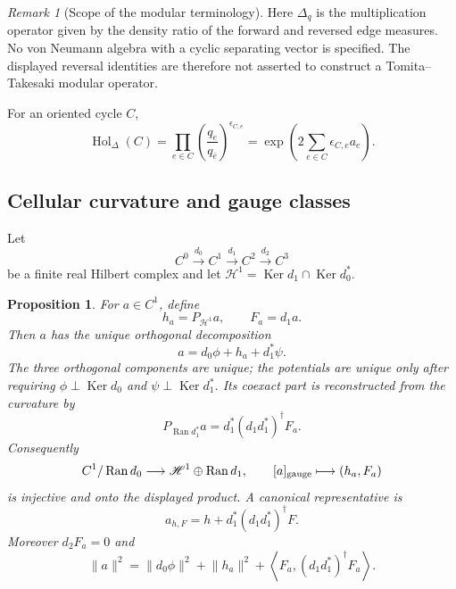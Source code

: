 \documentclass[11pt]{article}
\newtheorem{proposition}[proposition]{Proposition}
\theoremstyle{definition}
\theoremstyle{remark}
\newtheorem{remark}[remark]{Remark}
\theoremstyle{definition}
\theoremstyle{remark}
\newcommand{\Ker}{\operatorname{Ker}}
\newcommand{\Ran}{\operatorname{Ran}}
\newcommand{\norm}[1]{\lVert#1\rVert}
\newcommand{\ip}[2]{\left\langle #1,#2\right\rangle}
\begin{document}
\begin{remark}[Scope of the modular terminology]
Here $\Delta_q$ is the multiplication operator given by the density ratio
of the forward and reversed edge measures.  No von Neumann algebra with a
cyclic separating vector is specified.  The displayed reversal identities
are therefore not asserted to construct a Tomita--Takesaki modular operator.
\end{remark}

For an oriented cycle $C$,
\begin{equation}
 \operatorname{Hol}_{\Delta}(C)
 =\prod_{e\in C}\left(\frac{q_e}{q_{\bar e}}\right)^{\epsilon_{C,e}}
 =\exp\left(2\sum_{e\in C}\epsilon_{C,e}a_e\right).
 \label{eq:supp-modular-cycle-holonomy}
\end{equation}

\subsection{Cellular curvature and gauge classes}

Let
\begin{equation}
 C^0\xrightarrow{d_0}C^1\xrightarrow{d_1}C^2
 \xrightarrow{d_2}C^3
 \label{eq:supp-cellular-Hodge-complex}
\end{equation}
be a finite real Hilbert complex and let
$\mathscr H^1=\Ker d_1\cap\Ker d_0^*$.

\begin{proposition}
\label{thm:supp-modular-Hodge}
For $a\in C^1$, define
\begin{equation}
 h_a=P_{\mathscr H^1}a,
 \qquad
 F_a=d_1a.
 \label{eq:supp-modular-hF}
\end{equation}
Then $a$ has the unique orthogonal decomposition
\begin{equation}
 {a=d_0\phi+h_a+d_1^*\psi.}
 \label{eq:supp-modular-Hodge}
\end{equation}
The three orthogonal components are unique; the potentials are unique only after
requiring $\phi\perp\Ker d_0$ and $\psi\perp\Ker d_1^*$.
Its coexact part is reconstructed from the curvature by
\begin{equation}
 P_{\Ran d_1^*}a
 =d_1^*(d_1d_1^*)^\dagger F_a.
 \label{eq:supp-modular-coexact}
\end{equation}
Consequently
\begin{equation}
 C^1/\Ran d_0\longrightarrow\mathscr H^1\oplus\Ran d_1,
 \qquad
 [a]_{\rm gauge}\longmapsto(h_a,F_a)
 \label{eq:supp-modular-gauge-map}
\end{equation}
is injective and onto the displayed product.  A canonical representative is
\begin{equation}
 a_{h,F}=h+d_1^*(d_1d_1^*)^\dagger F.
 \label{eq:supp-modular-representative}
\end{equation}
Moreover $d_2F_a=0$ and
\begin{equation}
 \norm a^2
 =\norm{d_0\phi}^2+\norm{h_a}^2
 +\ip{F_a}{(d_1d_1^*)^\dagger F_a}.
 \label{eq:supp-modular-norm}
\end{equation}
\end{proposition}
\end{document}
